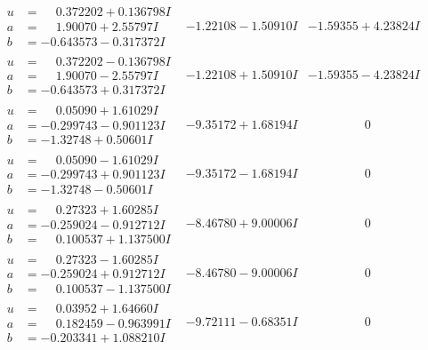 \documentclass[1p]{elsarticle_modified}
\theoremstyle{definition}
\begin{document}
$$\begin{array}{c|c|c}
\begin{aligned}
u &= \phantom{-}0.372202 + 0.136798 I \\
a &= \phantom{-}1.90070 + 2.55797 I \\
b &= -0.643573 - 0.317372 I\end{aligned}
 & -1.22108 - 1.50910 I & -1.59355 + 4.23824 I \\ \hline\begin{aligned}
u &= \phantom{-}0.372202 - 0.136798 I \\
a &= \phantom{-}1.90070 - 2.55797 I \\
b &= -0.643573 + 0.317372 I\end{aligned}
 & -1.22108 + 1.50910 I & -1.59355 - 4.23824 I \\ \hline\begin{aligned}
u &= \phantom{-}0.05090 + 1.61029 I \\
a &= -0.299743 - 0.901123 I \\
b &= -1.32748 + 0.50601 I\end{aligned}
 & -9.35172 + 1.68194 I & \phantom{-0.000000 } 0 \\ \hline\begin{aligned}
u &= \phantom{-}0.05090 - 1.61029 I \\
a &= -0.299743 + 0.901123 I \\
b &= -1.32748 - 0.50601 I\end{aligned}
 & -9.35172 - 1.68194 I & \phantom{-0.000000 } 0 \\ \hline\begin{aligned}
u &= \phantom{-}0.27323 + 1.60285 I \\
a &= -0.259024 - 0.912712 I \\
b &= \phantom{-}0.100537 + 1.137500 I\end{aligned}
 & -8.46780 + 9.00006 I & \phantom{-0.000000 } 0 \\ \hline\begin{aligned}
u &= \phantom{-}0.27323 - 1.60285 I \\
a &= -0.259024 + 0.912712 I \\
b &= \phantom{-}0.100537 - 1.137500 I\end{aligned}
 & -8.46780 - 9.00006 I & \phantom{-0.000000 } 0 \\ \hline\begin{aligned}
u &= \phantom{-}0.03952 + 1.64660 I \\
a &= \phantom{-}0.182459 - 0.963991 I \\
b &= -0.203341 + 1.088210 I\end{aligned}
 & -9.72111 - 0.68351 I & \phantom{-0.000000 } 0 \\ \hline\begin{aligned}

\end{aligned}
\end{array}$$
\end{document}
